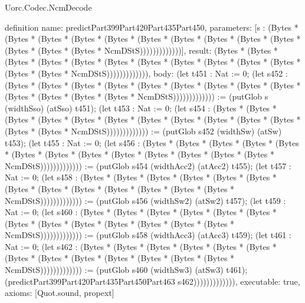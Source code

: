 \begin{lexlean}{Uorc.Codec.NcmDecode}
\begin{semanticmodule}
definition{
  name: predictPart399Part420Part435Part450,
  parameters: [s : (Bytes * (Bytes * (Bytes * (Bytes * (Bytes * (Bytes * (Bytes * (Bytes * (Bytes * (Bytes * (Bytes * (Bytes * (Bytes * NcmDStS)))))))))))))],
  result: (Bytes * (Bytes * (Bytes * (Bytes * (Bytes * (Bytes * (Bytes * (Bytes * (Bytes * (Bytes * (Bytes * (Bytes * (Bytes * NcmDStS))))))))))))),
  body: (let t451 : Nat := 0; (let s452 : (Bytes * (Bytes * (Bytes * (Bytes * (Bytes * (Bytes * (Bytes * (Bytes * (Bytes * (Bytes * (Bytes * (Bytes * (Bytes * NcmDStS))))))))))))) := (putGlob s (widthSso) (atSso) t451); (let t453 : Nat := 0; (let s454 : (Bytes * (Bytes * (Bytes * (Bytes * (Bytes * (Bytes * (Bytes * (Bytes * (Bytes * (Bytes * (Bytes * (Bytes * (Bytes * NcmDStS))))))))))))) := (putGlob s452 (widthSw) (atSw) t453); (let t455 : Nat := 0; (let s456 : (Bytes * (Bytes * (Bytes * (Bytes * (Bytes * (Bytes * (Bytes * (Bytes * (Bytes * (Bytes * (Bytes * (Bytes * (Bytes * NcmDStS))))))))))))) := (putGlob s454 (widthAcc2) (atAcc2) t455); (let t457 : Nat := 0; (let s458 : (Bytes * (Bytes * (Bytes * (Bytes * (Bytes * (Bytes * (Bytes * (Bytes * (Bytes * (Bytes * (Bytes * (Bytes * (Bytes * NcmDStS))))))))))))) := (putGlob s456 (widthSw2) (atSw2) t457); (let t459 : Nat := 0; (let s460 : (Bytes * (Bytes * (Bytes * (Bytes * (Bytes * (Bytes * (Bytes * (Bytes * (Bytes * (Bytes * (Bytes * (Bytes * (Bytes * NcmDStS))))))))))))) := (putGlob s458 (widthAcc3) (atAcc3) t459); (let t461 : Nat := 0; (let s462 : (Bytes * (Bytes * (Bytes * (Bytes * (Bytes * (Bytes * (Bytes * (Bytes * (Bytes * (Bytes * (Bytes * (Bytes * (Bytes * NcmDStS))))))))))))) := (putGlob s460 (widthSw3) (atSw3) t461); (predictPart399Part420Part435Part450Part463 s462))))))))))))),
  executable: true,
  axioms: [Quot.sound, propext]
}


\end{semanticmodule}
\end{lexlean}
